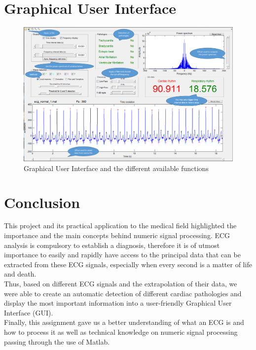 \documentclass[11pt]{article}
\begin{document}
\section{Graphical User Interface}

			\begin{figure}[h]
				\centering
				\includegraphics[scale=0.45]{images/GUI_bulle.png}
				\caption{Graphical User Interface and the different available functions}
				\label{Q412}
			\end{figure}


\section{Conclusion}
	This project and its practical application to the medical field highlighted the importance and the main concepts behind numeric signal processing. ECG analysis is compulsory to establish a diagnosis, therefore it is of utmost importance to easily and rapidly have access to the principal data that can be extracted from these ECG signals, especially when every second is a matter of life and death.\\
	Thus, based on different ECG signals and the extrapolation of their data, we were able to create an automatic detection of different cardiac pathologies and display the most important information into a user-friendly Graphical User Interface (GUI).\\
	Finally, this assignment gave us a better understanding of what an ECG is and how to process it as well as technical knowledge on numeric signal processing passing through the use of Matlab.\\
\end{document}
